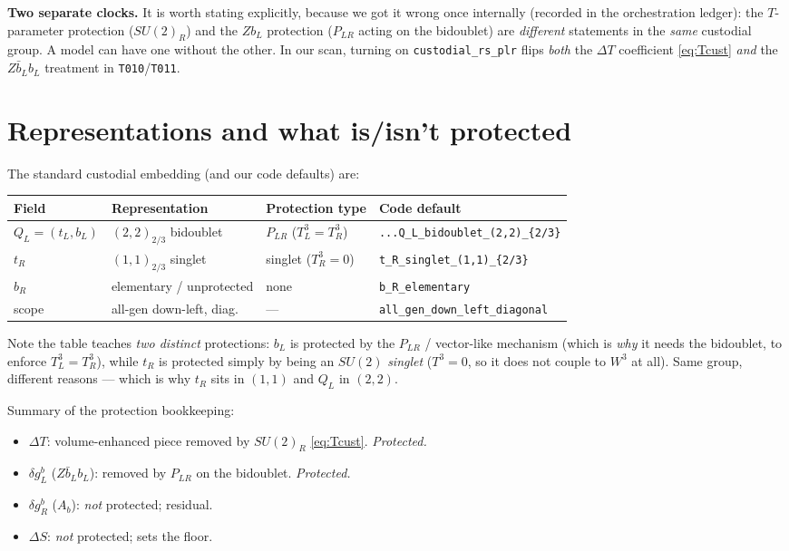 \documentclass[11pt]{article}
\newcommand{\SUR}{SU(2)_R}
\newcommand{\PLR}{P_{LR}}
\newcommand{\code}[1]{\texttt{#1}}
\theoremstyle{definition}
\begin{document}
\textbf{Two separate clocks.} It is worth stating explicitly, because we got it
wrong once internally (recorded in the orchestration ledger): the $T$-parameter
protection ($\SUR$) and the $Zb_L$ protection ($\PLR$ acting on the bidoublet)
are \emph{different} statements in the \emph{same} custodial group. A model can
have one without the other. In our scan, turning on \code{custodial\_rs\_plr}
flips \emph{both} the $\Delta T$ coefficient \eqref{eq:Tcust} \emph{and} the
$Z\bar b_L b_L$ treatment in \code{T010}/\code{T011}.

\section{Representations and what is/isn't protected}
\label{sec:reps}

The standard custodial embedding (and our code defaults) are:
\begin{center}
\begin{tabular}{llll}
\toprule
Field & Representation & Protection type & Code default \\
\midrule
$Q_L=(t_L,b_L)$ & $(2,2)_{2/3}$ bidoublet & $\PLR$ ($T^3_L=T^3_R$) & \code{...Q\_L\_bidoublet\_(2,2)\_\{2/3\}} \\
$t_R$ & $(1,1)_{2/3}$ singlet & singlet ($T^3_R=0$) & \code{t\_R\_singlet\_(1,1)\_\{2/3\}} \\
$b_R$ & elementary / unprotected & none & \code{b\_R\_elementary} \\
scope & all-gen down-left, diag.\ & --- & \code{all\_gen\_down\_left\_diagonal} \\
\bottomrule
\end{tabular}
\end{center}
Note the table teaches \emph{two distinct} protections: $b_L$ is protected by
the $\PLR$ / vector-like mechanism (which is \emph{why} it needs the bidoublet,
to enforce $T^3_L=T^3_R$), while $t_R$ is protected simply by being an
$SU(2)$ \emph{singlet} ($T^3=0$, so it does not couple to $W^3$ at all). Same
group, different reasons --- which is why $t_R$ sits in $(1,1)$ and $Q_L$ in
$(2,2)$.

Summary of the protection bookkeeping:
\begin{itemize}[leftmargin=1.4em]
\item $\Delta T$: volume-enhanced piece removed by $\SUR$ \eqref{eq:Tcust}. \emph{Protected.}
\item $\delta g_L^b$ ($Z\bar b_L b_L$): removed by $\PLR$ on the bidoublet. \emph{Protected.}
\item $\delta g_R^b$ ($A_b$): \emph{not} protected; residual.
\item $\Delta S$: \emph{not} protected; sets the floor.
\end{itemize}
\end{document}

